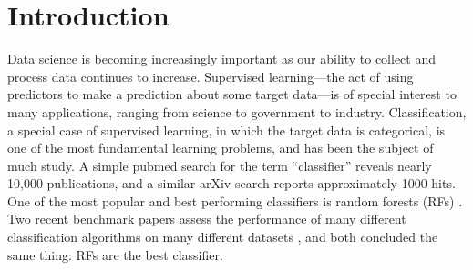 \documentclass{article}
\begin{document}
\section{Introduction}
\label{intro}

Data science is becoming increasingly important as our ability to collect and process data continues to increase. Supervised learning---the act of using predictors to make a prediction about some target data---is of special interest to many applications, ranging from science to government to industry. Classification, a special case of supervised learning, in which the target data is categorical, is one of the most fundamental learning problems, and has been the subject of much study. A simple pubmed search for the term ``classifier'' reveals nearly 10,000 publications, and a similar arXiv search reports approximately 1000 hits. One of the most popular and best performing classifiers is random forests (RFs) \cite{Breiman2001}. Two recent benchmark papers assess the performance of many different classification algorithms on many different datasets \cite{Delgado2014,Caruana2008}, and both concluded the same thing: RFs are the best classifier.
\end{document}
